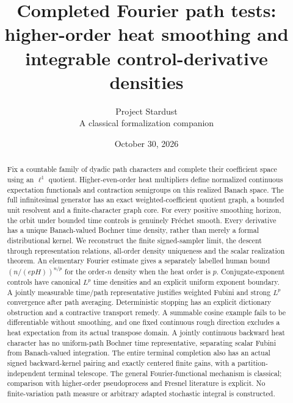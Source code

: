 \documentclass[11pt]{article}
\title{Completed Fourier path tests:\\higher-order heat smoothing and\\integrable control-derivative densities}
\author{Project Stardust\\\small A classical formalization companion}
\date{October 30, 2026}
\theoremstyle{remark}\newtheorem{remark}[theorem]{Remark}
\begin{document}
\maketitle
\begin{abstract}
Fix a countable family of dyadic path characters and complete their coefficient space using an $\ell^1$ quotient. Higher-even-order heat multipliers define normalized continuous expectation functionals and contraction semigroups on this realized Banach space. The full infinitesimal generator has an exact weighted-coefficient quotient graph, a bounded unit resolvent and a finite-character graph core. For every positive smoothing horizon, the orbit under bounded time controls is genuinely Fr\'echet smooth. Every derivative has a unique Banach-valued Bochner time density, rather than merely a formal distributional kernel. We reconstruct the finite signed-sampler limit, the descent through representation relations, all-order density uniqueness and the scalar realization theorem. An elementary Fourier estimate gives a separately labelled human bound $(n/(epH))^{n/p}$ for the order-$n$ density when the heat order is $p$. Conjugate-exponent controls have canonical $L^p$ time densities and an explicit uniform exponent boundary. A jointly measurable time/path representative justifies weighted Fubini and strong $L^p$ convergence after path averaging. Deterministic stopping has an explicit dictionary obstruction and a contractive transport remedy. A summable cosine example fails to be differentiable without smoothing, and one fixed continuous rough direction excludes a heat expectation from its actual transpose domain. A jointly continuous backward heat character has no uniform-path Bochner time representative, separating scalar Fubini from Banach-valued integration. The entire terminal completion also has an actual signed backward-kernel pairing and exactly centered finite gains, with a partition-independent terminal telescope. The general Fourier-functional mechanism is classical; comparison with higher-order pseudoprocess and Fresnel literature is explicit. No finite-variation path measure or arbitrary adapted stochastic integral is constructed.
\end{abstract}
\end{document}
